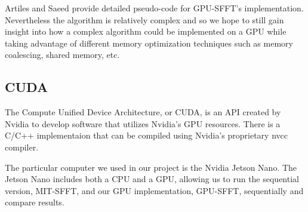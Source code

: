 Artiles and Saeed provide detailed pseudo-code for GPU-SFFT's implementation. 
Nevertheless the algorithm is relatively complex and so we hope to still gain insight into how a complex algorithm could be implemented on a GPU while taking advantage of different memory optimization techniques such as memory coalescing, shared memory, etc.


\subsection{CUDA}
The Compute Unified Device Architecture, or CUDA, is an API created by Nvidia to develop software that utilizes Nvidia's GPU resources. There is a C/C++ implementaion that can be compiled using Nvidia's proprietary nvcc compiler.

The particular computer we used in our project is the Nvidia Jetson Nano. The Jetson Nano includes both a CPU and a GPU, allowing us to run the sequential version, MIT-SFFT, and our GPU implementation, GPU-SFFT, sequentially and compare results.